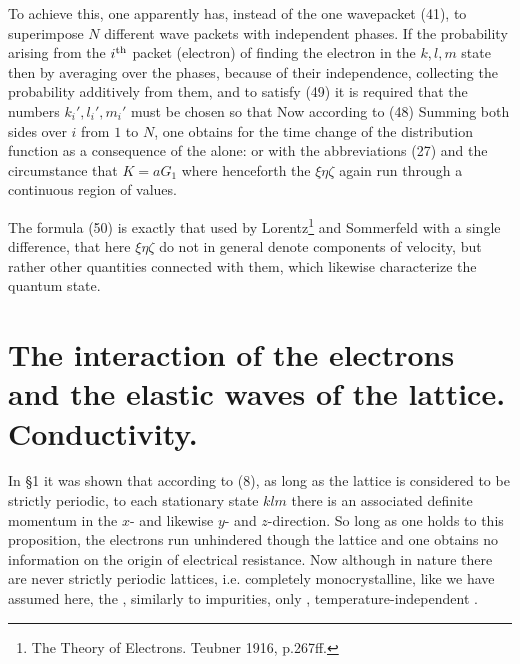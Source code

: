 \begin{paper}{1}
To achieve this, one apparently has, instead of the one wavepacket (41), to superimpose $N$ different wave packets with independent phases. If the probability arising from the $i{}^\text{th}$ packet (electron) of finding the electron in the $k,l,m$ state
then by averaging over the phases, because of their independence, collecting the probability additively from them, and to satisfy (49) it is required that the numbers $k_i',l_i',m_i'$ must be chosen so that
Now according to (48)
Summing both sides over $i$ from $1$ to $N$, one obtains for the time change of the distribution function as a consequence of the  alone:
or with the abbreviations (27) and the circumstance that $K=aG_1$
where henceforth the $\xi\eta\zeta$ again run through a continuous region of values.

The formula (50) is exactly that used by Lorentz\footnote{The Theory of Electrons. Teubner 1916, p.267ff.} and Sommerfeld with a single difference, that here $\xi\eta\zeta$ do not in general denote components of velocity, but rather other quantities connected with them, which likewise characterize the quantum state.

\section{The interaction of the electrons and the elastic waves of the lattice. Conductivity.} In \S1 it was shown that according to (8), as long as the lattice is considered to be strictly periodic, to each stationary state $klm$ there is an associated definite momentum in the $x$- and likewise $y$- and $z$-direction. So long as one holds to this proposition, the electrons run unhindered though the lattice and one obtains no information on the origin of electrical resistance. Now although in nature there are never strictly periodic lattices, i.e. completely monocrystalline, like we have assumed here, the , similarly to impurities, only , temperature-independent .


\end{paper}
